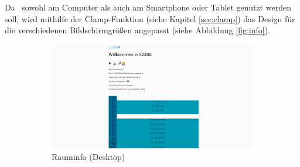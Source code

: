 
\clearpage
{}

Da \ZELIA\ sowohl am Computer als auch am Smartphone oder Tablet genutzt werden soll, wird mithilfe der Clamp-Funktion (siehe Kapitel \ref{sec:clamp}) das Design für die verschiedenen Bildschirmgrößen angepasst (siehe Abbildung \ref{fig:info}).


\begin{figure}[H]
    \begin{subfigure}[c]{0.65\textwidth}
        \centering
        \includegraphics[width=\textwidth]{media/ResponsiveDesign/ZeliaDesktop.png}
        \caption{Rauminfo (Desktop)}
    \end{subfigure} \hfill
    \begin{subfigure}[c]{0.35\textwidth}
        \centering

\end{subfigure}
\end{figure}

